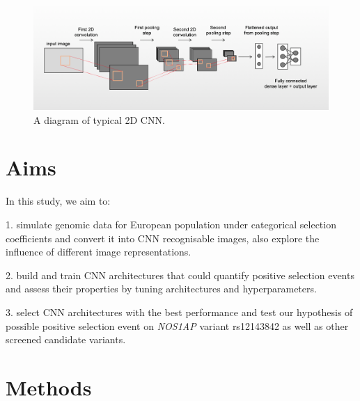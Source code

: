 \documentclass[a4paper,12pt,oneside]{extarticle}
\begin{document}
\begin{figure}[H] 
  \captionsetup{singlelinecheck = false, justification=justified}
  \centering
  \includegraphics[trim = 0 5mm 0 5mm, clip,width=1\textwidth]{figure1.png}
  \caption{A diagram of typical 2D CNN.}
\end{figure}

\cleardoublepage\clearpage
\section{Aims}
In this study, we aim to:
\par
1. simulate genomic data for European population under categorical selection coefficients and convert it into CNN recognisable images, also explore the influence of different image representations.
\par
2. build and train CNN architectures that could quantify positive selection events and assess their properties by tuning architectures and hyperparameters.
\par
3. select CNN architectures with the best performance and test our hypothesis of possible positive selection event on \textit{NOS1AP} variant rs12143842 as well as other screened candidate variants.


\cleardoublepage\clearpage
\section{Methods}
\end{document}
